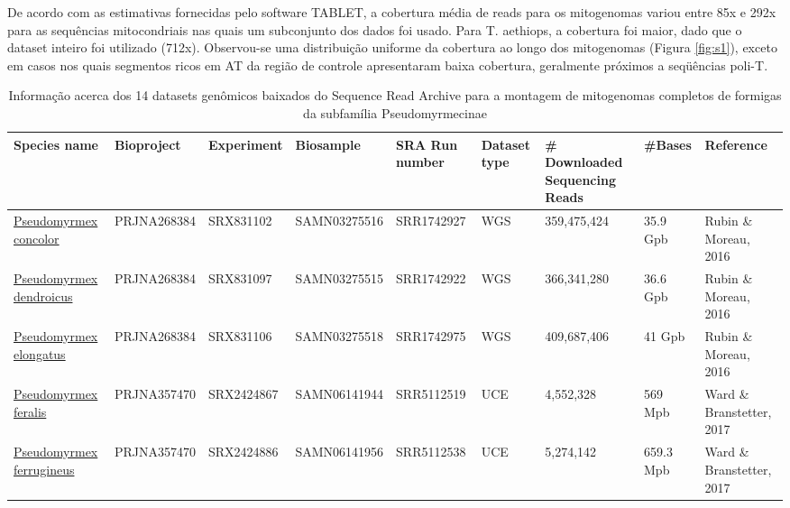 \documentclass[../DISSERTACAO_MAIN.tex]{subfiles}
\begin{document}
	De acordo com as estimativas fornecidas pelo software TABLET, a cobertura média de reads para os mitogenomas variou entre 85x e 292x para as sequências mitocondriais nas quais um subconjunto dos dados foi usado. Para T. aethiops, a cobertura foi maior, dado que o dataset inteiro foi utilizado (712x). Observou-se uma distribuição uniforme da cobertura ao longo dos mitogenomas (Figura \ref{fig:s1}), exceto em casos nos quais segmentos ricos em AT da região de controle apresentaram baixa cobertura, geralmente próximos a seqüências poli-T.
	
\begin{landscape}
	\begin{table}
	\centering
	\caption[Metadados dos datasets públicos]{Informação acerca dos 14 datasets genômicos baixados do Sequence Read Archive para a montagem de mitogenomas completos de formigas da subfamília Pseudomyrmecinae}
	{\small
	\begin{tabularx}{.9\linewidth}{| X | X | X | X | X | p{1.5cm} | X | p{1.5cm} | X |}

		\hline

		Species name & Bioproject & Experiment & Biosample & SRA Run number & Dataset type & \# Downloaded Sequencing Reads & \#Bases & Reference  \\ \hline

		\href{ftp://ftp.sra.ebi.ac.uk/vol1/srr/SRR174/007/SRR1742927}{Pseudomyrmex concolor} & PRJNA268384 & SRX831102 & SAMN03275516 & SRR1742927 & WGS & 359,475,424 & 35.9 Gpb & Rubin \& Moreau, 2016  \\ \hline

		\href{ftp://ftp.sra.ebi.ac.uk/vol1/srr/SRR174/002/SRR1742922}{Pseudomyrmex dendroicus} & PRJNA268384 & SRX831097 & SAMN03275515 & SRR1742922 & WGS & 366,341,280 & 36.6 Gpb & Rubin \& Moreau, 2016 \\ \hline

		\href{ftp://ftp.sra.ebi.ac.uk/vol1/srr/SRR174/005/SRR1742975}{Pseudomyrmex elongatus} & PRJNA268384 & SRX831106 & SAMN03275518 & SRR1742975 & WGS & 409,687,406 & 41 Gpb & Rubin \& Moreau, 2016 \\ \hline

		\href{ftp://ftp.sra.ebi.ac.uk/vol1/srr/SRR511/009/SRR5112519}{Pseudomyrmex feralis} & PRJNA357470 & SRX2424867 & SAMN06141944 & SRR5112519 & UCE & 4,552,328 & 569 Mpb & Ward \& Branstetter, 2017 \\ \hline

		\href{ftp://ftp.sra.ebi.ac.uk/vol1/srr/SRR511/008/SRR5112538}{Pseudomyrmex ferrugineus} & PRJNA357470 & SRX2424886 & SAMN06141956 & SRR5112538 & UCE & 5,274,142 & 659.3 Mpb & Ward \& Branstetter, 2017 \\ \hline


\end{tabularx}}
\end{table}
\end{landscape}
\end{document}
